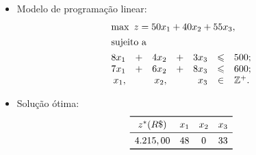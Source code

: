 \documentclass[12pt]{article}
\begin{document}
\begin{tcolorbox}[rounded corners, breakable,colback=yellow!5, colframe=red!40!black, title=\textbf{Modelo PL para o problema P-\myprob}]
\begin{itemize}[topsep=0pt]
\begin{enumerate}[topsep=0pt,itemsep=0pt]
   \end{enumerate}
%
    \item Modelo de programação linear:
    \small{
     $$\begin{array}{rcrcrcl}
        \multicolumn{7}{l}{\max\ z= 50x_1 + 40x_2 + 55x_3,} \\[4pt]
        \multicolumn{7}{l}{\text{sujeito a}} \\[4pt]
          8x_1 & + & 4x_2 & + & 3x_3 & \leqslant & 500;\\
          7x_1 & + & 6x_2 & + & 8x_3 & \leqslant & 600;\\
          x_1, &   & x_2, &   & x_3 & \in       & \mathbb{Z}^+.
       \end{array}$$
    }
%
    \item Solução ótima:
     $$
      \begin{array}{cccc}
      \toprule
      z^* (R\$) & x_1 & x_2 & x_3\\
      \midrule
      4.215,00  &  48 &   0 &  33\\
      \bottomrule
      \end{array}
     $$
 \end{itemize}
\end{tcolorbox}
\end{document}
